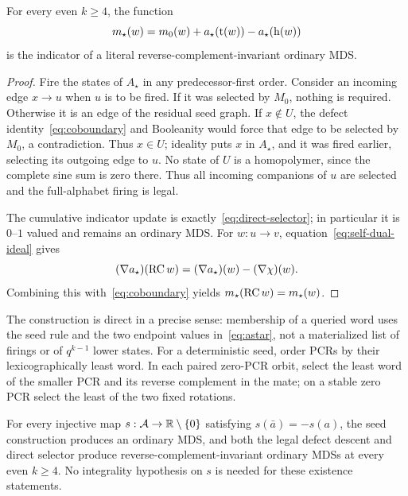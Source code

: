 \begin{theorem}
\label{thm:direct}
For every even $k\geq4$, the function
\begin{equation}
  m_\star(w)=m_0(w)+a_\star(\operatorname{t}(w))-a_\star(\operatorname{h}(w))
  \label{eq:direct-selector}
\end{equation}
is the indicator of a literal reverse-complement-invariant ordinary MDS.
\end{theorem}

\begin{proof}
Fire the states of $A_\star$ in any predecessor-first order.  Consider an
incoming edge $x\to u$ when $u$ is to be fired.  If it was selected by
$M_0$, nothing is required.  Otherwise it is an edge of the residual seed
graph.  If $x\notin U$, the defect identity~\eqref{eq:coboundary} and
Booleanity would force that edge to be selected by $M_0$, a contradiction.
Thus $x\in U$; ideality puts $x$ in $A_\star$, and it was fired earlier,
selecting its outgoing edge to $u$.  No state of $U$ is a
homopolymer, since the complete sine sum is zero there.  Thus all incoming
companions of $u$ are selected and the full-alphabet firing is legal.

The cumulative indicator update is exactly~\eqref{eq:direct-selector}; in
particular it is $0$--$1$ valued and remains an ordinary MDS.  For
$w:u\to v$, equation~\eqref{eq:self-dual-ideal} gives
\[
  (\nabla a_\star)(\operatorname{RC} w)
  =(\nabla a_\star)(w)-(\nabla\chi)(w).
\]
Combining this with~\eqref{eq:coboundary} yields
$m_\star(\operatorname{RC} w)=m_\star(w)$.
\end{proof}

The construction is direct in a precise sense: membership of a queried word
uses the seed rule and the two endpoint values in~\eqref{eq:astar}, not a
materialized list of firings or of $q^{k-1}$ lower states.  For a deterministic
seed, order PCRs by their lexicographically least word.  In each paired
zero-PCR orbit, select the least word of the smaller PCR and its reverse
complement in the mate; on a stable zero PCR select the least of the two
fixed rotations.

\begin{corollary}
\label{cor:real-weights}
For every injective map
$s:\mathcal A\to\mathbb R\setminus\{0\}$ satisfying
$s(\bar a)=-s(a)$, the seed construction produces an ordinary MDS, and both
the legal defect descent and direct selector produce
reverse-complement-invariant ordinary MDSs at every even $k\geq4$.  No
integrality hypothesis on $s$ is needed for these existence statements.
\end{corollary}

